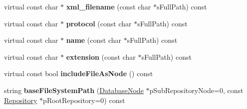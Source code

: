 \begin{DoxyCompactItemize}
\item 
\hypertarget{classgeneral__server_1_1Repository_acad682e42db26159e5f1094ad7d92908}{virtual const char $\ast$ {\bfseries xml\-\_\-filename} (const char $\ast$s\-Full\-Path) const }\label{classgeneral__server_1_1Repository_acad682e42db26159e5f1094ad7d92908}

\item 
\hypertarget{classgeneral__server_1_1Repository_a6c56d1ccc7a941846cdfe6d56a88a002}{virtual const char $\ast$ {\bfseries protocol} (const char $\ast$s\-Full\-Path) const }\label{classgeneral__server_1_1Repository_a6c56d1ccc7a941846cdfe6d56a88a002}

\item 
\hypertarget{classgeneral__server_1_1Repository_a4e1ae4c42e7b07f45e081c72afd12f3a}{virtual const char $\ast$ {\bfseries name} (const char $\ast$s\-Full\-Path) const }\label{classgeneral__server_1_1Repository_a4e1ae4c42e7b07f45e081c72afd12f3a}

\item 
\hypertarget{classgeneral__server_1_1Repository_ace3a622bd1821d42f5edac376a4b4986}{virtual const char $\ast$ {\bfseries extension} (const char $\ast$s\-Full\-Path) const }\label{classgeneral__server_1_1Repository_ace3a622bd1821d42f5edac376a4b4986}

\item 
\hypertarget{classgeneral__server_1_1Repository_ad96b85b7ae41ceff45b588f67e2f1997}{virtual const bool {\bfseries include\-File\-As\-Node} () const }\label{classgeneral__server_1_1Repository_ad96b85b7ae41ceff45b588f67e2f1997}

\item 
\hypertarget{classgeneral__server_1_1Repository_a3287a5621db6d3f27b4ca5b715351cb1}{string {\bfseries base\-File\-System\-Path} (\hyperlink{classgeneral__server_1_1DatabaseNode}{\-Database\-Node} $\ast$p\-Sub\-Repository\-Node=0, const \hyperlink{classgeneral__server_1_1Repository}{\-Repository} $\ast$p\-Root\-Repository=0) const }\label{classgeneral__server_1_1Repository_a3287a5621db6d3f27b4ca5b715351cb1}

\end{DoxyCompactItemize}

